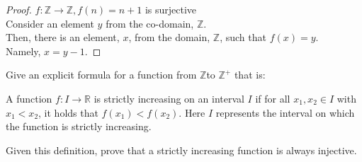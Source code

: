 \documentclass[a4paper]{exam}
\theoremstyle{definition}
\newcommand\Z{\ensuremath{\mathbb{Z}}}
\newcommand\R{\ensuremath{\mathbb{R}}}
\begin{document}
\begin{questions}
\begin{solution}
    \begin{proof}$f: \Z\to\Z, f(n) = n+1$ is surjective\\
      Consider an element $y$ from the co-domain, \Z.\\
      Then, there is an element, $x$, from the domain, \Z, such that $f(x)=y$.\\
      Namely, $x=y-1$.
    \end{proof}
  \end{solution}
  
\question Give an explicit formula for a function from \Z to $\Z^+$ that is:

\question A function \(f: I \rightarrow \R\) is strictly increasing on an interval \(I\) if for all \(x_1, x_2 \in I\) with \(x_1 < x_2\), it holds that \(f(x_1) < f(x_2)\). Here $I$ represents the interval on which the function is strictly increasing.
  
  Given this definition, prove that a strictly increasing function is always injective.

  \begin{solution}
  \end{solution}
\end{questions}
\end{document}
